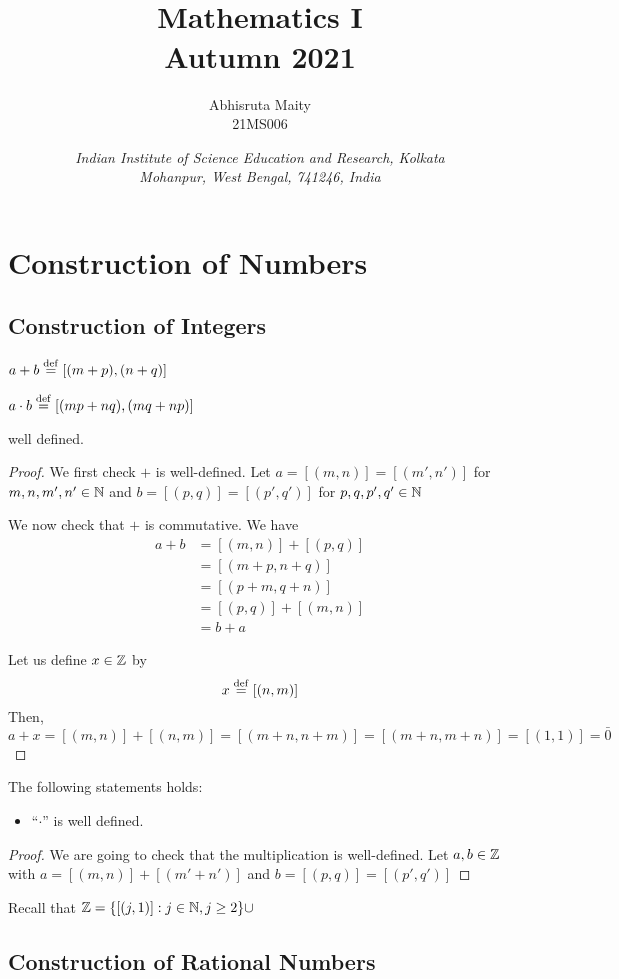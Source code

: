 \documentclass[11pt]{scrartcl}
\title{
    {\Large \text{MA1101}} \\
    {\Huge \textbf{Mathematics I}} \\
    \vspace{5pt}
    {\Large Autumn 2021}
}
\author{
    {\large Abhisruta Maity} \\
    {\small \textsc{21MS006}}
}
\date{\normalsize
    \emph{Indian Institute of Science Education and Research, Kolkata \\
    Mohanpur, West Bengal, 741246, India}
}
\begin{document}
    \maketitle

    \tableofcontents
    
    \newpage

    \section{Construction of Numbers}
    \subsection{Construction of Integers}
    \begin{definition}[Addition]
        \(a + b \overset{\mathrm{def}}{=} [(m + p), (n + q)]\)
    \end{definition}
    \begin{definition}[Multiplication]
        \(a \cdot b \overset{\mathrm{def}}{=} [(mp + nq), (mq + np)]\)
    \end{definition}
    \begin{theorem}
        well defined.
    \end{theorem}
    \begin{proof}
        We first check \(+\) is well-defined.
        Let \(a = [(m,n)] = [(m',n')]\) for \(m, n, m', n' \in \mathbb N \) and \(b = [(p,q)] = [(p',q')]\) for \(p, q, p', q' \in \mathbb N \)
        

        We now check that \(+\) is commutative. We have
        \begin{align*}
            a + b &= [(m,n)] + [(p,q)] \\ &= [(m+p, n+q)] \\ &= [(p+m, q+n)] \\ &= [(p,q)] + [(m,n)] \\ &= b + a
        \end{align*}

        Let us define \(x \in \mathbb Z\) by \[x \overset{\mathrm{def}}{=} [(n,m)]\]
        Then, \(a+x = [(m,n)] + [(n,m)] = [(m+n, n+m)] = [(m+n, m+n)] = [(1,1)] = \bar{0}\)
    \end{proof}
    \begin{theorem}
        The following statements holds:
        \begin{itemize}
            \item ``\(\cdot\)'' is well defined.
        \end{itemize}
    \end{theorem}
    \begin{proof}
        We are going to check that the multiplication is well-defined. Let \(a, b \in \mathbb Z\) with \(a = [(m,n)]+ [(m'+n')]\) and \(b = [(p,q)] = [(p',q')]\)
    \end{proof}
    
    \newpage

    Recall that \(\mathbb Z = \{[(j,1)]: j \in \mathbb N, j\geq 2\} \cup     \)

    \subsection{Construction of Rational Numbers}
\end{document}
